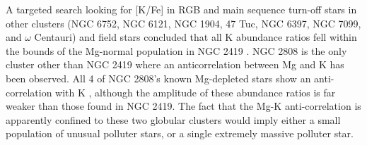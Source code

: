 \documentclass[a4paper,fleqn,usenatbib]{mnras}
\begin{document}
A targeted search looking for [K/Fe] in RGB and main sequence turn-off stars in other clusters (NGC 6752, NGC 6121, NGC 1904, 47 Tuc, NGC 6397, NGC 7099, and $\omega$ Centauri) and field stars concluded that all K abundance ratios fell within the bounds of the Mg-normal population in NGC 2419 \citep{carretta2013}. 
NGC 2808 is the only cluster other than NGC 2419 where an anticorrelation between Mg and K has been observed. All 4 of NGC 2808's known Mg-depleted stars show an anti-correlation with K \citep{mucciarelli2015}, although the amplitude of these abundance ratios is far weaker than those found in NGC 2419. The fact that the Mg-K anti-correlation is apparently confined to these two globular clusters would imply either a small population of unusual polluter stars, or a single extremely massive polluter star.






\end{document}
